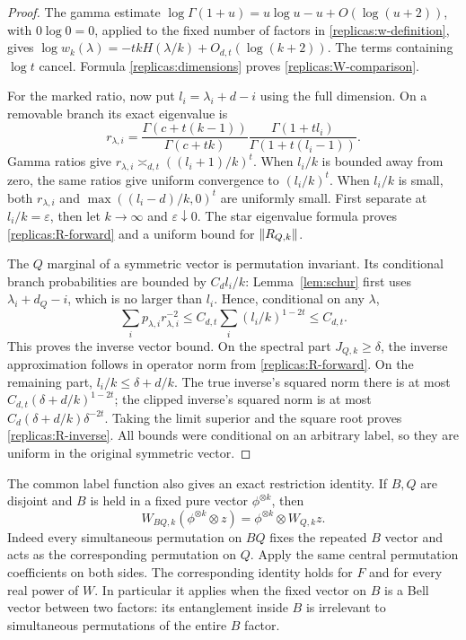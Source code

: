 \begin{proof}
The gamma estimate
$\log\Gamma(1+u)=u\log u-u+O(\log(u+2))$, with $0\log0=0$,
applied to the fixed number of factors in
\eqref{replicas:w-definition}, gives
$\log w_k(\lambda)=-tkH(\lambda/k)+O_{d,t}(\log(k+2))$.
The terms containing $\log t$ cancel.  Formula
\eqref{replicas:dimensions} proves \eqref{replicas:W-comparison}.

For the marked ratio, now put $l_i=\lambda_i+d-i$ using the full
dimension.  On a removable branch its exact eigenvalue is
\begin{equation}\label{replicas:ratio-eigenvalue}
 r_{\lambda,i}=
 \frac{\Gamma(c+t(k-1))}{\Gamma(c+tk)}
 \frac{\Gamma(1+t l_i)}{\Gamma(1+t(l_i-1))}.
\end{equation}
Gamma ratios give $r_{\lambda,i}\asymp_{d,t}((l_i+1)/k)^t$.
When $l_i/k$ is bounded away from zero, the same ratios give uniform
convergence to $(l_i/k)^t$.  When $l_i/k$ is small, both
$r_{\lambda,i}$ and $\max((l_i-d)/k,0)^t$ are uniformly small.
First separate at $l_i/k=\varepsilon$, then let
$k\to\infty$ and $\varepsilon\downarrow0$.  The star eigenvalue
formula proves \eqref{replicas:R-forward} and a uniform bound for
$\lVert R_{Q,k}\rVert$.

The $Q$ marginal of a symmetric vector is permutation invariant.
Its conditional branch probabilities are bounded by $C_d l_i/k$:
Lemma~\ref{lem:schur} first uses $\lambda_i+d_Q-i$, which is no
larger than $l_i$.  Hence, conditional on any $\lambda$,
\[
 \sum_i p_{\lambda,i}r_{\lambda,i}^{-2}
 \le C_{d,t}\sum_i(l_i/k)^{1-2t}\le C_{d,t}.
\]
This proves the inverse vector bound.  On the spectral part
$J_{Q,k}\ge\delta$, the inverse approximation follows in operator
norm from \eqref{replicas:R-forward}.  On the remaining part,
$l_i/k\le\delta+d/k$.  The true inverse's squared norm there is at
most $C_{d,t}(\delta+d/k)^{1-2t}$; the clipped inverse's squared
norm is at most $C_d(\delta+d/k)\delta^{-2t}$.
Taking the limit superior and the square root proves
\eqref{replicas:R-inverse}.  All bounds were conditional on an
arbitrary label, so they are uniform in the original symmetric
vector.
\end{proof}

The common label function also gives an exact restriction identity.
If $B,Q$ are disjoint and $B$ is held in a fixed pure vector
$\phi^{\otimes k}$, then
\begin{equation}\label{replicas:fixed-factor}
 W_{BQ,k}(\phi^{\otimes k}\otimes z)
       =\phi^{\otimes k}\otimes W_{Q,k}z.
\end{equation}
Indeed every simultaneous permutation on $BQ$ fixes the repeated
$B$ vector and acts as the corresponding permutation on $Q$.
Apply the same central permutation coefficients on both sides.
The corresponding identity holds for $F$ and for every real power of
$W$.  In particular it applies when the fixed vector on $B$ is a Bell
vector between two factors: its entanglement inside $B$ is irrelevant
to simultaneous permutations of the entire $B$ factor.

